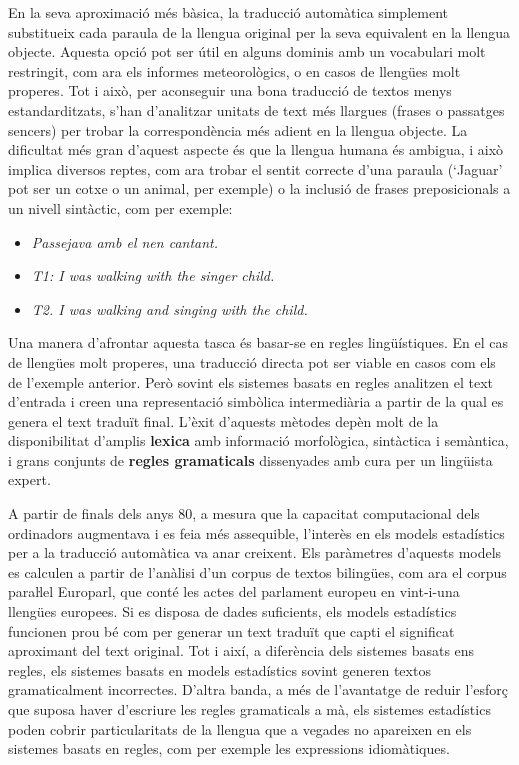 \begin{multicols}{2}
En la seva aproximació més bàsica, la traducció automàtica simplement substitueix cada paraula de la llengua original per la seva equivalent en la llengua objecte. Aquesta opció pot ser útil en alguns dominis amb un vocabulari molt restringit, com ara els informes meteorològics, o en casos de llengües molt properes. Tot i això, per aconseguir una bona traducció de textos menys estandarditzats, s’han d’analitzar unitats de text més llargues (frases o passatges sencers) per trobar la correspondència més adient en la llengua objecte. La dificultat més gran d’aquest aspecte és que la llengua humana és ambigua, i això implica diversos reptes, com ara trobar el sentit correcte d’una paraula (‘Jaguar’ pot ser un cotxe o un animal, per exemple) o la inclusió de frases preposicionals a un nivell sintàctic, com per exemple:
\begin{itemize}
\item \textit{Passejava amb el nen cantant.}
\item \textit{T1: I was walking with the singer child.}
\item \textit{T2. I was walking and singing with the child.}
\end{itemize}

Una manera d’afrontar aquesta tasca és basar-se en regles lingüístiques. En el cas de llengües molt properes, una traducció directa pot ser viable en casos com els de l’exemple anterior. Però sovint els sistemes basats en regles analitzen el text d’entrada i creen una representació simbòlica intermediària a partir de la qual es genera el text traduït final. L’èxit d’aquests mètodes depèn molt de la disponibilitat d’amplis \textbf{lexica} amb informació morfològica, sintàctica i semàntica, i grans conjunts de \textbf{regles gramaticals} dissenyades amb cura per un lingüista expert.

A partir de finals dels anys 80, a mesura que la capacitat computacional dels ordinadors augmentava i es feia més assequible, l’interès en els models estadístics per a la traducció automàtica va anar creixent. Els paràmetres d’aquests models es calculen a partir de l’anàlisi d’un corpus de textos bilingües, com ara el corpus paraŀlel Europarl, que conté les actes del parlament europeu en vint-i-una llengües europees. Si es disposa de dades suficients, els models estadístics funcionen prou bé com per generar un text traduït que capti el significat aproximant del text original. Tot i així, a diferència dels sistemes basats ens regles, els sistemes basats en models estadístics sovint generen textos gramaticalment incorrectes. D’altra banda, a més de l’avantatge de reduir l’esforç que suposa haver d’escriure les regles gramaticals a mà, els sistemes estadístics poden cobrir particularitats de la llengua que a vegades no apareixen en els sistemes basats en regles, com per exemple les expressions idiomàtiques. 


\end{multicols}
